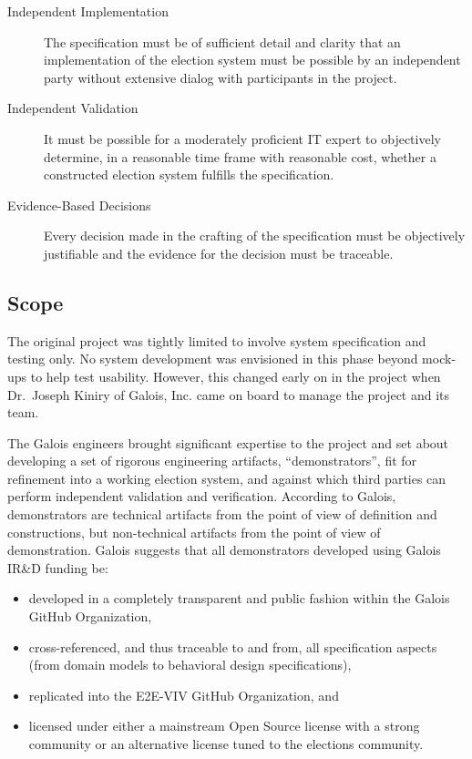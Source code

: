 \begin{description}
\item[Independent Implementation] The specification must be of
  sufficient detail and clarity that an implementation of the election
  system must be possible by an independent party without extensive
  dialog with participants in the project.
\item[Independent Validation] It must be possible for a moderately
  proficient IT expert to objectively determine, in a reasonable time
  frame with reasonable cost, whether a constructed election system
  fulfills the specification.
\item[Evidence-Based Decisions] Every decision made in the crafting of
  the specification must be objectively justifiable and the evidence
  for the decision must be traceable.
\end{description}

\subsection{Scope}
\label{sec:scope}

The original project was tightly limited to involve system
specification and testing only. No system development was envisioned
in this phase beyond mock-ups to help test usability. However, this
changed early on in the project when Dr.~Joseph Kiniry of Galois, Inc.
came on board to manage the project and its team.

The Galois engineers brought significant expertise to the project and
set about developing a set of rigorous engineering artifacts,
``demonstrators'', fit for refinement into a working election system,
and against which third parties can perform independent validation and
verification. According to Galois, demonstrators are technical
artifacts from the point of view of definition and constructions, but
non-technical artifacts from the point of view of
demonstration. Galois suggests that all demonstrators developed using
Galois IR\&D funding be:
\begin{itemize}
\item developed in a completely transparent and public fashion within
  the Galois GitHub Organization,
\item cross-referenced, and thus traceable to and from, all
  specification aspects (from domain models to behavioral design
  specifications),
\item replicated into the E2E-VIV GitHub Organization, and
\item licensed under either a mainstream Open Source license with a
  strong community or an alternative license tuned to the elections
  community.
\end{itemize}

